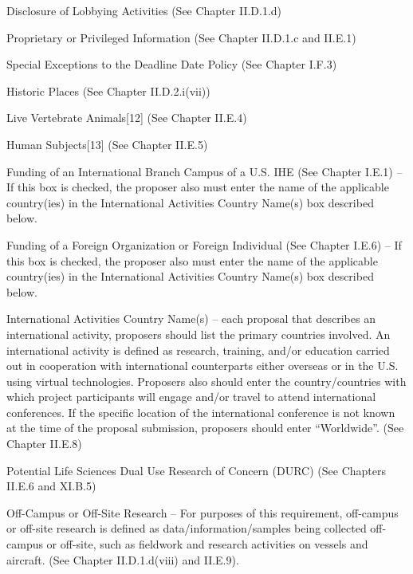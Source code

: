 {Disclosure of Lobbying Activities (See Chapter II.D.1.d)

Proprietary or Privileged Information (See Chapter II.D.1.c and II.E.1)

Special Exceptions to the Deadline Date Policy (See Chapter I.F.3)

Historic Places (See Chapter II.D.2.i(vii))

Live Vertebrate Animals[12] (See Chapter II.E.4)

Human Subjects[13] (See Chapter II.E.5)

Funding of an International Branch Campus of a U.S. IHE (See Chapter I.E.1) – If this box is checked, the proposer also must enter the name of the applicable country(ies) in the International Activities Country Name(s) box described below.

Funding of a Foreign Organization or Foreign Individual (See Chapter I.E.6) – If this box is checked, the proposer also must enter the name of the applicable country(ies) in the International Activities Country Name(s) box described below.

International Activities Country Name(s) – each proposal that describes an international activity, proposers should list the primary countries involved. An international activity is defined as research, training, and/or education carried out in cooperation with international counterparts either overseas or in the U.S. using virtual technologies. Proposers also should enter the country/countries with which project participants will engage and/or travel to attend international conferences. If the specific location of the international conference is not known at the time of the proposal submission, proposers should enter “Worldwide”. (See Chapter II.E.8)

Potential Life Sciences Dual Use Research of Concern (DURC) (See Chapters II.E.6 and XI.B.5)

Off-Campus or Off-Site Research – For purposes of this requirement, off-campus or off-site research is defined as data/information/samples being collected off-campus or off-site, such as fieldwork and research activities on vessels and aircraft. (See Chapter II.D.1.d(viii) and II.E.9).
}
